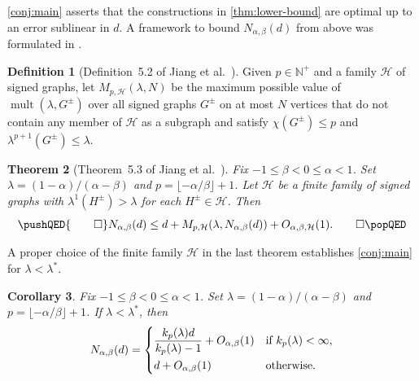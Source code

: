\documentclass[11pt]{article}
\newtheorem{theorem}{Theorem}[section]
\newtheorem{corollary}[theorem]{Corollary}
\theoremstyle{definition}
\newtheorem{definition}[theorem]{Definition}
\theoremstyle{remark}
\newcommand{\al}{\alpha}
\newcommand{\be}{\beta}
\newcommand{\la}{\lambda}
\newcommand{\kpl}{k_p(\la)}
\newcommand{\HH}{\mathcal{H}}
\newcommand{\N}{\mathbb{N}}
\newcommand{\Nabd}{N_{\al,\be}(d)}
\newcommand{\mult}{\operatorname{mult}}
\begin{document}
\cref{conj:main} asserts that the constructions in \cref{thm:lower-bound} are optimal up to an error sublinear in $d$. A framework to bound $\Nabd$ from above was formulated in \cite{JTYZZ23}.

\begin{definition}[Definition~5.2 of Jiang et al.~\cite{JTYZZ23}] \label{def:mph}
    Given $p \in \N^+$ and a family $\HH$ of signed graphs, let $M_{p, \HH}(\la, N)$ be the maximum possible value of $\mult(\la, G^\pm)$ over all signed graphs $G^\pm$ on at most $N$ vertices that do not contain any member of $\HH$ as a subgraph and satisfy $\chi(G^\pm) \le p$ and $\la^{p+1}(G^\pm) \le \la$.
\end{definition}

\begin{theorem}[Theorem~5.3 of Jiang et al.~\cite{JTYZZ23}] \label{thm:upper-bound}
    Fix $-1 \le \be < 0 \le \al < 1$. Set $\la = (1-\al)/(\al - \be)$ and $p = \lfloor -\al/\be \rfloor + 1$. Let $\HH$ be a finite family of signed graphs with $\la^1(H^\pm) > \la$ for each $H^\pm \in \HH$. Then
    \begin{equation*}
        \pushQED{\qed}
        N_{\al,\be}(d) \le d + M_{p, \HH}(\la, \Nabd) + O_{\al, \be, 
        \HH}(1).  \qedhere
        \popQED
    \end{equation*}
\end{theorem}

A proper choice of the finite family $\HH$ in the last theorem establishes \cref{conj:main} for $\la < \la^*$.

\begin{corollary} \label{cor:spherical}
    Fix $-1 \le \be < 0 \le \al < 1$. Set $\la = (1-\al)/(\al-\be)$ and $p = \lfloor -\al / \be \rfloor + 1$. If $\la < \la^*$, then
    \[
        \Nabd = \begin{dcases}
            \frac{\kpl d}{\kpl-1} + O_{\al,\be}(1) & \text{if }\kpl < \infty, \\
            d + O_{\al,\be}(1) & \text{otherwise}.
        \end{dcases}
    \]
\end{corollary}
\end{document}
